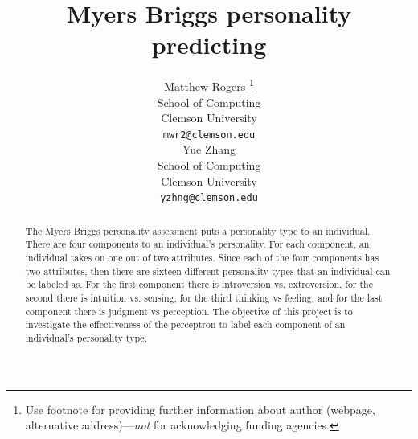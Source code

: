 \documentclass{article}
\title{Myers Briggs personality predicting}
\author{
  Matthew Rogers \thanks{Use footnote for providing further information
    about author (webpage, alternative address)---\emph{not} for acknowledging
    funding agencies.} \\
  School of Computing\\
  Clemson University\\
  \texttt{mwr2@clemson.edu} \\
  \And
  Yue Zhang\\
  School of Computing\\
  Clemson University\\
  \texttt{yzhng@clemson.edu} \\
}
\begin{document}
\maketitle


\begin{abstract}
  The Myers Briggs personality assessment puts a personality type to an individual. There are four components to an individual’s personality. For each component, an individual takes on one out of two attributes. Since each of the four components has two attributes, then there are sixteen different personality types that an individual can be labeled as. For the first component there is introversion vs. extroversion, for the second there is intuition vs. sensing, for the third thinking vs feeling, and for the last component there is judgment vs perception. The objective of this project is to investigate the effectiveness of the perceptron to label each component of an individual’s personality type.
 
\end{abstract}
\end{document}
